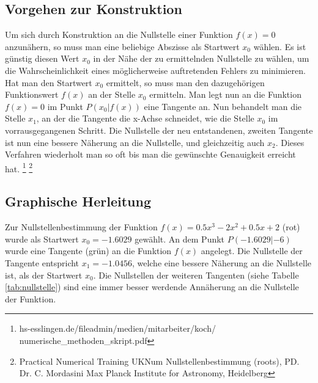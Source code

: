 \documentclass[a4paper,12pt,fleqn,oneside]{article}
\begin{document}
	\subsection{Vorgehen zur Konstruktion}
		Um sich durch Konstruktion an die Nullstelle einer Funktion $f(x) = 0$ anzunähern, so muss man eine beliebige Abszisse als Startwert $x_0$
		wählen. Es ist günstig diesen Wert $x_0$ in der Nähe der zu ermittelnden Nullstelle zu wählen, um die Wahrscheinlichkeit eines möglicherweise
		auftretenden Fehlers zu minimieren. Hat man den Startwert $x_0$ ermittelt, so muss man den dazugehörigen Funktionswert $f(x)$ an der Stelle
		$x_0$ ermitteln. Man legt nun an die Funktion $f(x) = 0$ im Punkt $P(x_0|f(x))$ eine Tangente an. Nun behandelt man die Stelle $x_1$, an der
		die Tangente die x-Achse schneidet, wie die Stelle $x_0$ im vorrausgegangenen Schritt. Die Nullstelle der neu entstandenen, zweiten Tangente
		ist nun eine bessere Näherung an die Nullstelle, und gleichzeitig auch $x_2$. Dieses Verfahren wiederholt man so oft bis man die gewünschte
		Genauigkeit erreicht hat.
		\footnote{hs-esslingen.de/fileadmin/medien/mitarbeiter/koch/\\numerische\_methoden\_skript.pdf}
		\footnote{Practical Numerical Training UKNum Nullstellenbestimmung (roots), PD. Dr. C. Mordasini Max Planck Institute for Astronomy, Heidelberg}
		
\newpage

	\subsection{Graphische Herleitung}
		Zur Nullstellenbestimmung der Funktion $f(x) = \num{0.5}x^3 - 2x^2 + \num{0.5}x + 2$ (rot) wurde als Startwert $x_0 = \num{-1.6029}$
		gewählt. An dem Punkt $P(\num{-1.6029}|\num{-6})$ wurde eine Tangente (grün) an die Funktion $f(x)$ angelegt. Die Nullstelle der Tangente
		entspricht $x_1 = \num{-1.0456}$, welche eine bessere Näherung an die Nullstelle ist, als der Startwert $x_0$. Die Nullstellen der weiteren
		Tangenten (siehe Tabelle \ref{tab:nullstelle}) sind eine immer besser werdende Annäherung an die Nullstelle der Funktion.
		
\end{document}
